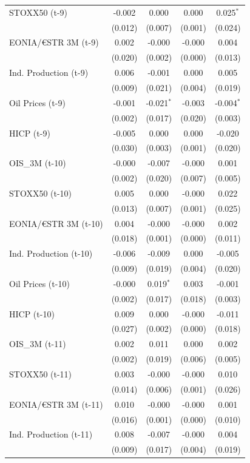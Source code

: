\begin{longtable}[t]{lcccc}
STOXX50 (t-9) & -0.002 & 0.000 & 0.000 & 0.025$^{*}$\\
 & (0.012) & (0.007) & (0.001) & (0.024)\\
EONIA/€STR 3M (t-9) & 0.002 & -0.000 & -0.000 & 0.004\\
 & (0.020) & (0.002) & (0.000) & (0.013)\\
Ind. Production (t-9) & 0.006 & -0.001 & 0.000 & 0.005\\
 & (0.009) & (0.021) & (0.004) & (0.019)\\
Oil Prices (t-9) & -0.001 & -0.021$^{*}$ & -0.003 & -0.004$^{*}$\\
 & (0.002) & (0.017) & (0.020) & (0.003)\\
HICP (t-9) & -0.005 & 0.000 & 0.000 & -0.020\\
 & (0.030) & (0.003) & (0.001) & (0.020)\\
OIS\_3M (t-10) & -0.000 & -0.007 & -0.000 & 0.001\\
 & (0.002) & (0.020) & (0.007) & (0.005)\\
STOXX50 (t-10) & 0.005 & 0.000 & -0.000 & 0.022\\
 & (0.013) & (0.007) & (0.001) & (0.025)\\
EONIA/€STR 3M (t-10) & 0.004 & -0.000 & -0.000 & 0.002\\
 & (0.018) & (0.001) & (0.000) & (0.011)\\
Ind. Production (t-10) & -0.006 & -0.009 & 0.000 & -0.005\\
 & (0.009) & (0.019) & (0.004) & (0.020)\\
Oil Prices (t-10) & -0.000 & 0.019$^{*}$ & 0.003 & -0.001\\
 & (0.002) & (0.017) & (0.018) & (0.003)\\
HICP (t-10) & 0.009 & 0.000 & -0.000 & -0.011\\
 & (0.027) & (0.002) & (0.000) & (0.018)\\
OIS\_3M (t-11) & 0.002 & 0.011 & 0.000 & 0.002\\
 & (0.002) & (0.019) & (0.006) & (0.005)\\
STOXX50 (t-11) & 0.003 & -0.000 & -0.000 & 0.010\\
 & (0.014) & (0.006) & (0.001) & (0.026)\\
EONIA/€STR 3M (t-11) & 0.010 & -0.000 & -0.000 & 0.001\\
 & (0.016) & (0.001) & (0.000) & (0.010)\\
Ind. Production (t-11) & 0.008 & -0.007 & -0.000 & 0.004\\
 & (0.009) & (0.017) & (0.004) & (0.019)\\

\end{longtable}
